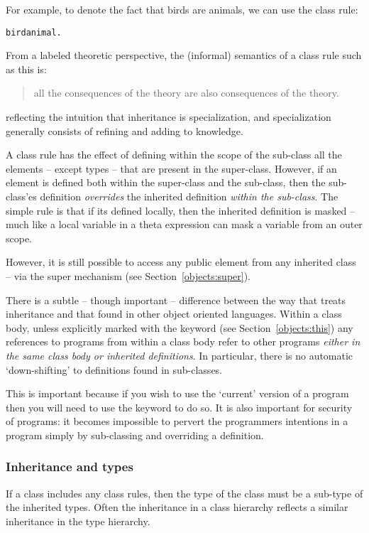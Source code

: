 For example, to denote the fact that birds are animals, we can use the class rule:
\begin{alltt}
bird \classarrow{} animal.
\end{alltt}
From a labeled theoretic perspective, the (informal) semantics of a class rule such as this is:
\begin{quote}
all the consequences of the  theory are also consequences of the  theory.
\end{quote}
reflecting the intuition that inheritance is specialization, and specialization generally consists of refining and adding to knowledge.

A class rule has the effect of defining within the scope of the sub-class all the elements -- except types -- that are present in the super-class. However, if an element is defined both within the super-class and the sub-class, then the sub-class'es definition \emph{overrides} the inherited definition \emph{within the sub-class}. The simple rule is that if its defined locally, then the inherited definition is masked -- much like a local variable in a theta expression can mask a variable from an outer scope.

However, it is still possible to access any public element from any inherited class -- via the super mechanism (see Section~\vref{objects:super}).

\begin{aside}
There is a subtle -- though important -- difference between the way that \go treats inheritance and that found in other object oriented languages. Within a class body, unless explicitly marked with the  keyword (see Section~\vref{objects:this}) any references to programs from within a class body refer to other programs \emph{either in the same class body or inherited definitions}. In particular, there is no automatic `down-shifting' to definitions found in sub-classes.

This is important because if you wish to use the `current' version of a program then you will need to use the  keyword to do so. It is also important for security of programs: it becomes impossible to pervert the programmers intentions in a program simply by sub-classing and overriding a definition.
\end{aside}

\subsubsection{Inheritance and types}
If a class includes any class rules, then the type of the class must be a sub-type of the inherited types. Often the inheritance in a class hierarchy reflects a similar inheritance in the type hierarchy.

